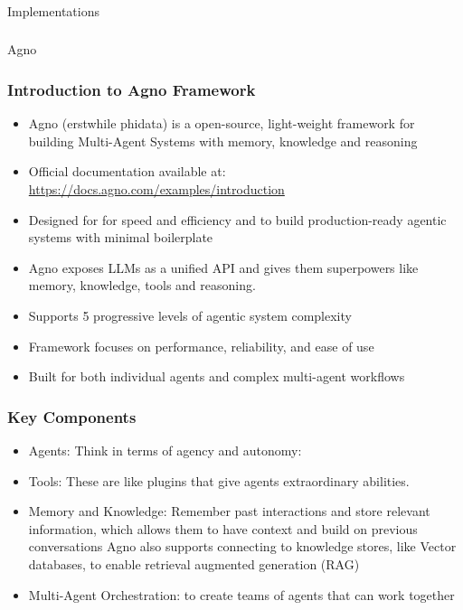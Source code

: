 \begin{frame}[fragile]\frametitle{}
\begin{center}
{\Large Implementations}
\end{center}
\end{frame}

\begin{frame}[fragile]\frametitle{}
\begin{center}
{\Large Agno}
\end{center}
\end{frame}

\begin{frame}[fragile]\frametitle{Introduction to Agno Framework}
      \begin{itemize}
	\item Agno (erstwhile phidata) is a open-source, light-weight framework for building Multi-Agent Systems with memory, knowledge and reasoning
	\item Official documentation available at: \url{https://docs.agno.com/examples/introduction}
	\item Designed for for speed and efficiency and to build production-ready agentic systems with minimal boilerplate
	\item Agno exposes LLMs as a unified API and gives them superpowers like memory, knowledge, tools and reasoning.
	\item Supports 5 progressive levels of agentic system complexity
	\item Framework focuses on performance, reliability, and ease of use
	\item Built for both individual agents and complex multi-agent workflows
	  \end{itemize}
\end{frame}

\begin{frame}[fragile]\frametitle{Key Components}

    \begin{itemize}
	\item Agents: Think in terms of agency and autonomy:
	\item Tools: These are like plugins that give agents extraordinary abilities. 
	\item Memory and Knowledge: Remember past interactions and store relevant information, which allows them to have context and build on previous conversations
Agno also supports connecting to knowledge stores, like Vector databases, to enable retrieval augmented generation (RAG)
	\item Multi-Agent Orchestration: to create teams of agents that can work together
	  \end{itemize}
\end{frame}

